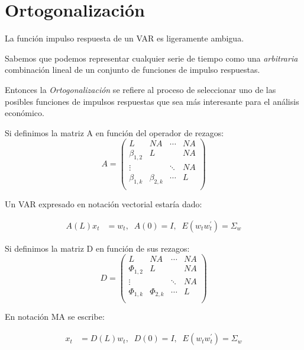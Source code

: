 \documentclass[
]{book}
\begin{document}
\hypertarget{ortogonalizaciuxf3n}{%
\section{Ortogonalización}\label{ortogonalizaciuxf3n}}

La función impulso respuesta de un VAR es ligeramente ambigua.

Sabemos que podemos representar cualquier serie de tiempo como una \emph{arbitraria} combinación lineal de un conjunto de funciones de impulso respuestas.

Entonces la \emph{Ortogonalización} se refiere al proceso de seleccionar uno de las posibles funciones de impulsos respuestas que sea más interesante para el análisis económico.

Si definimos la matriz A en función del operador de rezagos:
\begin{equation}
A=\left( \begin{array}{cccc}
L      & NA  & \cdots & NA\\
\beta_{1,2} & L   &        & NA\\
\vdots &     & \ddots & NA\\
\beta_{1,k} & \beta_{2,k}   & \cdots & L\\
\end{array}
\right)
\end{equation}

Un VAR expresado en notación vectorial estaría dado:

\begin{align}
A(L)x_{t}&=w_{t},\;\;A(0)=I,\;\;E(w_{t}w_{t}^{'})=\Sigma_w 
\end{align}

Si definimos la matriz D en función de sus rezagos:
\begin{equation}
D=\left( \begin{array}{cccc}
L      & NA  & \cdots & NA\\
\Phi_{1,2} & L   &        & NA\\
\vdots &     & \ddots & NA\\
\Phi_{1,k} & \Phi_{2,k}   & \cdots & L\\
\end{array}
\right)
\end{equation}

En notación MA se escribe:

\begin{align}
x_{t}&=D(L)w_{t},\;\;D(0)=I,\;\;E(w_{t}w_{t}^{'})=\Sigma_w 
\end{align}
\end{document}
